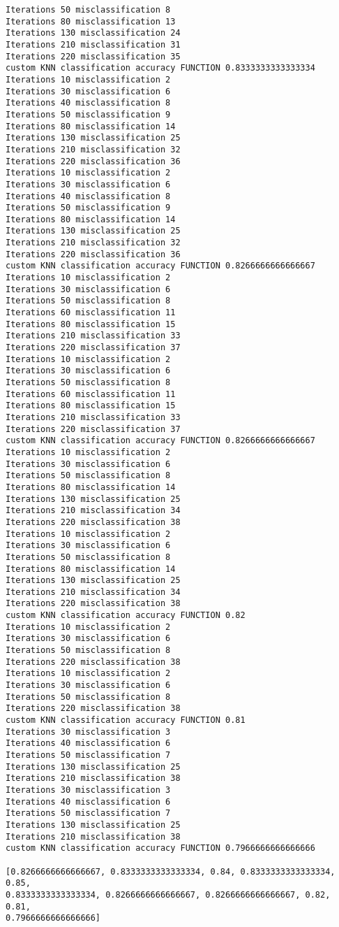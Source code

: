 \documentclass[11pt]{article}
\begin{document}
\begin{Verbatim}[commandchars=\\\{\}]
Iterations 50 misclassification 8
Iterations 80 misclassification 13
Iterations 130 misclassification 24
Iterations 210 misclassification 31
Iterations 220 misclassification 35
custom KNN classification accuracy FUNCTION 0.8333333333333334
Iterations 10 misclassification 2
Iterations 30 misclassification 6
Iterations 40 misclassification 8
Iterations 50 misclassification 9
Iterations 80 misclassification 14
Iterations 130 misclassification 25
Iterations 210 misclassification 32
Iterations 220 misclassification 36
Iterations 10 misclassification 2
Iterations 30 misclassification 6
Iterations 40 misclassification 8
Iterations 50 misclassification 9
Iterations 80 misclassification 14
Iterations 130 misclassification 25
Iterations 210 misclassification 32
Iterations 220 misclassification 36
custom KNN classification accuracy FUNCTION 0.8266666666666667
Iterations 10 misclassification 2
Iterations 30 misclassification 6
Iterations 50 misclassification 8
Iterations 60 misclassification 11
Iterations 80 misclassification 15
Iterations 210 misclassification 33
Iterations 220 misclassification 37
Iterations 10 misclassification 2
Iterations 30 misclassification 6
Iterations 50 misclassification 8
Iterations 60 misclassification 11
Iterations 80 misclassification 15
Iterations 210 misclassification 33
Iterations 220 misclassification 37
custom KNN classification accuracy FUNCTION 0.8266666666666667
Iterations 10 misclassification 2
Iterations 30 misclassification 6
Iterations 50 misclassification 8
Iterations 80 misclassification 14
Iterations 130 misclassification 25
Iterations 210 misclassification 34
Iterations 220 misclassification 38
Iterations 10 misclassification 2
Iterations 30 misclassification 6
Iterations 50 misclassification 8
Iterations 80 misclassification 14
Iterations 130 misclassification 25
Iterations 210 misclassification 34
Iterations 220 misclassification 38
custom KNN classification accuracy FUNCTION 0.82
Iterations 10 misclassification 2
Iterations 30 misclassification 6
Iterations 50 misclassification 8
Iterations 220 misclassification 38
Iterations 10 misclassification 2
Iterations 30 misclassification 6
Iterations 50 misclassification 8
Iterations 220 misclassification 38
custom KNN classification accuracy FUNCTION 0.81
Iterations 30 misclassification 3
Iterations 40 misclassification 6
Iterations 50 misclassification 7
Iterations 130 misclassification 25
Iterations 210 misclassification 38
Iterations 30 misclassification 3
Iterations 40 misclassification 6
Iterations 50 misclassification 7
Iterations 130 misclassification 25
Iterations 210 misclassification 38
custom KNN classification accuracy FUNCTION 0.7966666666666666

[0.8266666666666667, 0.8333333333333334, 0.84, 0.8333333333333334, 0.85,
0.8333333333333334, 0.8266666666666667, 0.8266666666666667, 0.82, 0.81,
0.7966666666666666]
    \end{Verbatim}
\end{document}
